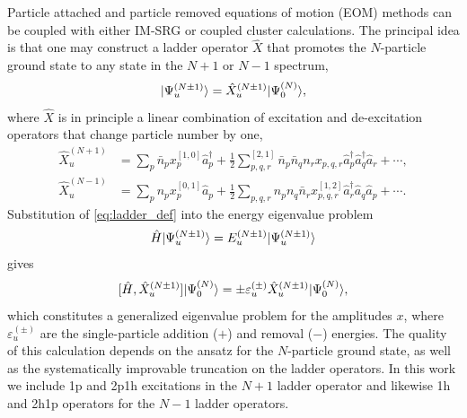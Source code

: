 Particle attached and particle removed equations of motion (EOM) methods can be coupled with either IM-SRG or coupled cluster calculations. The principal idea is that one may construct a ladder operator $\hat{X}$ that promotes the $N$-particle ground state to any state in the $N + 1$ or $N - 1$ spectrum,
\begin{equation}\label{eq:ladder_def}
  | \Psi^{(N \pm 1)}_u \rangle  = \hat{X}^{(N \pm 1)}_u | \Psi^{(N)}_0 \rangle,
\end{equation}
where $\hat{X}$ is in principle a linear combination of excitation and de-excitation operators that change particle number by one,
\begin{align}
  \label{eq:gen_attached}
  \hat{X}^{(N+1)}_u &= \sum_p \bar{n}_p x^{[1,0]}_p  \hat{a}^\dagger_p + \frac{1}{2} \sum^{[2,1]}_{p, q, r} \bar{n}_p \bar{n}_q n_r x_{p, q, r} \hat{a}^\dagger_p \hat{a}^\dagger_q \hat{a}_r + \cdots,  \\
  \label{eq:gen_removed}
  \hat{X}^{(N-1)}_u &= \sum_p n_p x_p^{[0,1]} \hat{a}_p + \frac{1}{2} \sum_{p, q, r} n_p n_q \bar{n}_r  x^{[1,2]}_{p, q, r} \hat{a}^\dagger_r \hat{a}_q \hat{a}_p  + \cdots.
\end{align}
Substitution of \eqref{eq:ladder_def} into the energy eigenvalue problem
\begin{gather*}
  \hat H | \Psi_u^{(N \pm 1)} \rangle = E^{(N\pm1)}_u | \Psi_u^{(N \pm 1)} \rangle
\end{gather*}
gives
\begin{equation}\label{eq:EOM}
  [\hat{H}, \hat{X}^{(N \pm 1)}_u] | \Psi^{(N)}_0 \rangle = \pm \varepsilon^{(\pm)}_u \hat{X}^{(N \pm 1)}_u | \Psi^{(N)}_0 \rangle,
\end{equation}
which constitutes a generalized eigenvalue problem for the amplitudes $x$, where $\varepsilon^{(\pm)}_u$ are the single-particle addition ($+$) and removal ($-$) energies. The quality of this calculation depends on the ansatz for the $N$-particle ground state, as well as the systematically improvable truncation on the ladder operators. In this work we include 1p and 2p1h excitations in the $N + 1$ ladder operator and likewise 1h and 2h1p operators for the $N - 1$ ladder operators.

